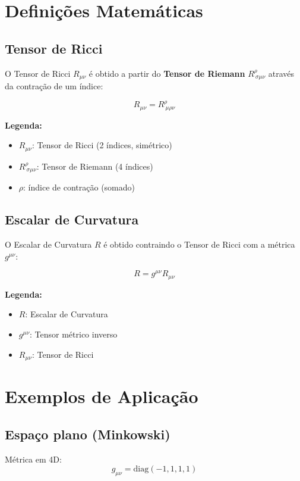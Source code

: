 \documentclass[12pt]{article}
\begin{document}
\section{Definições Matemáticas}

\subsection{Tensor de Ricci}

O Tensor de Ricci $R_{\mu\nu}$ é obtido a partir do \textbf{Tensor de Riemann} $R^\rho_{\ \sigma\mu\nu}$ através da contração de um índice:

\[
R_{\mu\nu} = R^\rho_{\ \mu\rho\nu}
\]

\textbf{Legenda:}
\begin{itemize}
    \item $R_{\mu\nu}$: Tensor de Ricci (2 índices, simétrico)
    \item $R^\rho_{\ \sigma\mu\nu}$: Tensor de Riemann (4 índices)
    \item $\rho$: índice de contração (somado)
\end{itemize}

\subsection{Escalar de Curvatura}

O Escalar de Curvatura $R$ é obtido contraindo o Tensor de Ricci com a métrica $g^{\mu\nu}$:

\[
R = g^{\mu\nu} R_{\mu\nu}
\]

\textbf{Legenda:}
\begin{itemize}
    \item $R$: Escalar de Curvatura
    \item $g^{\mu\nu}$: Tensor métrico inverso
    \item $R_{\mu\nu}$: Tensor de Ricci
\end{itemize}

\section{Exemplos de Aplicação}

\subsection{Espaço plano (Minkowski)}

Métrica em 4D:
\[
g_{\mu\nu} = \text{diag}(-1, 1, 1, 1)
\]
\end{document}

